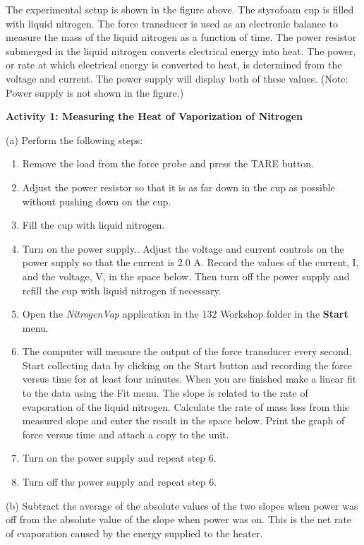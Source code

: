 The experimental setup is shown in the figure above. The styrofoam
cup is filled with liquid nitrogen. The force transducer is used as
an electronic balance to measure the mass of the liquid nitrogen as
a function of time. The power resistor submerged in the liquid nitrogen
converts electrical energy into heat. The power, or rate at which
electrical energy is converted to heat, is determined from
the voltage and current.  The power supply will
display both of these values.
(Note: Power supply is
not shown in the figure.)

\textbf{Activity 1: Measuring the Heat of Vaporization of Nitrogen}

(a) Perform the following steps:

\begin{enumerate}
\item Remove the load from the force probe and press the TARE button.
\item Adjust the power resistor so that it is as far down in the cup as
possible without pushing down on the cup.
\item Fill the cup with liquid nitrogen.
\item Turn on the power supply.. Adjust the voltage and
current controls on the power supply so that the current is
2.0 A. Record the values of the current, I, and the voltage, V,
in the space below. Then turn off the power supply and refill the
cup with liquid nitrogen if necessary.\vspace{1in}

\item Open the \textit{NitrogenVap} application in the 132 Workshop folder
in the {\bf Start} menu.
\item The computer will measure the output of the force transducer every
second. Start collecting data by clicking on the Start button and
recording the force versus time for at least four minutes. When you
are finished make a linear fit to the data using the Fit menu. The
slope is related to the rate of evaporation of the liquid nitrogen.
Calculate the rate of mass loss from this measured slope and enter
the result in the space below. Print the graph of force versus time
and attach a copy to the unit. \vspace{0.75in}

\item Turn on the power supply and repeat step 6.
\item Turn off the power supply and repeat step 6.
\end{enumerate}
(b) Subtract the average of the absolute values of the two slopes
when power was off from the absolute value of the slope when power
was on. This is the net rate of evaporation caused by the energy supplied
to the heater.

